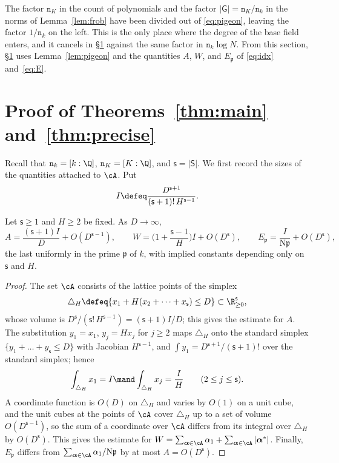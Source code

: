 \documentclass[11pt, reqno, twoside, letterpaper]{amsart}
\newcommand{\va}{\boldsymbol{\alpha}}
\newcommand{\Nm}{\mathrm{N}}
\newcommand{\fp}{\mathfrak{p}}
\newcommand{\dk}{{\mathtt{n}_k}}
\newcommand{\dK}{{\mathtt{n}_K}}
\newcommand{\wgt}{H}
\newcommand{\bxs}{N}
\newcommand{\dgb}{D}
\newcommand{\galKk}{\mathsf{G}}
\newcommand{\Kf}{K}
\newcommand{\idx}{\cA}
\newcommand{\rr}{A}
\newcommand{\Ew}{E}
\newcommand{\Ic}{I}
\newcommand{\Sset}{\mathsf{S}}
\newcommand{\nS}{\mathsf{s}}
\begin{document}
The factor $\dK$ in the count of polynomials and the factor
$|\galKk|=\dK/\dk$ in the norms of Lemma~\ref{lem:frob} have been
divided out of \eqref{eq:pigeon}, leaving the factor $1/\dk$ on the
left. This is the only place where the degree of the base field
enters, and it cancels in \S\ref{sec:proof} against the same factor in
$\dk\log\bxs$. From this section, \S\ref{sec:proof} uses
Lemma~\ref{lem:pigeon} and
the quantities $\rr$, $W$, and $\Ew_\fp$ of \eqref{eq:idx}
and~\eqref{eq:E}.

\section{Proof of Theorems~\ref{thm:main} and~\ref{thm:precise}}
\label{sec:proof}

Recall that $\dk=[k:\Q]$, $\dK=[\Kf:\Q]$, and $\nS=|\Sset|$. We first
record the sizes of the quantities attached to $\idx$. Put
\[
\Ic\defeq\frac{\dgb^{\nS+1}}{(\nS+1)!\,\wgt^{\nS-1}} .
\]

\begin{lemma}\label{lem:count}
Let $\nS\ge 1$ and $\wgt\ge 2$ be fixed. As $\dgb\to\infty$,
\[
\rr=\frac{(\nS+1)\Ic}{\dgb}+O(\dgb^{\nS-1}),\qquad
W=\Big(1+\frac{\nS-1}{\wgt}\Big)\Ic+O(\dgb^{\nS}),\qquad
\Ew_\fp=\frac{\Ic}{\Nm\fp}+O(\dgb^{\nS}),
\]
the last uniformly in the prime $\fp$ of $k$, with implied constants
depending only on $\nS$ and $\wgt$.
\end{lemma}

\begin{proof}
The set $\idx$ consists of the lattice points of the simplex
\[
\triangle_\wgt\defeq
\{x_1+\wgt(x_2+\dots+x_{\nS})\le\dgb\}\subset\R_{\ge 0}^{\nS},
\]
whose volume is $\dgb^{\nS}/(\nS!\,\wgt^{\nS-1})=(\nS+1)\Ic/\dgb$;
this gives the estimate for $\rr$. The substitution $y_1=x_1$,
$y_j=\wgt x_j$ for $j\ge 2$ maps $\triangle_\wgt$ onto the standard
simplex $\{y_1+\dots+y_{\nS}\le\dgb\}$ with Jacobian $\wgt^{\nS-1}$,
and $\int y_1=\dgb^{\nS+1}/(\nS+1)!$ over the standard simplex; hence
\[
\int_{\triangle_\wgt}x_1=\Ic\mand
\int_{\triangle_\wgt}x_j=\frac{\Ic}{\wgt}\qquad(2\le j\le\nS).
\]
A coordinate function is $O(\dgb)$ on $\triangle_\wgt$ and varies by
$O(1)$ on a unit cube, and the unit cubes at the points of $\idx$
cover $\triangle_\wgt$ up to a set of volume $O(\dgb^{\nS-1})$, so the
sum of a coordinate over $\idx$ differs from its integral over
$\triangle_\wgt$ by $O(\dgb^{\nS})$. This gives the estimate for
$W=\sum_{\va\in\idx}\alpha_1+\sum_{\va\in\idx}|\va^*|$. Finally,
$\Ew_\fp$ differs from $\sum_{\va\in\idx}\alpha_1/\Nm\fp$ by at most
$\rr=O(\dgb^{\nS})$.
\end{proof}
\end{document}
